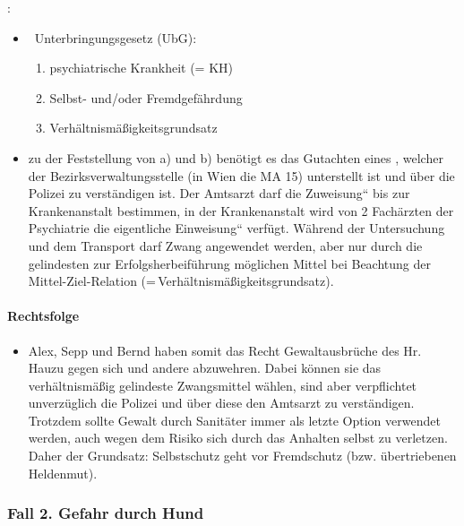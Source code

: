 :

\begin{itemize}
\item {}~Unterbringungsgesetz (UbG):

\begin{enumerate}
\item psychiatrische Krankheit (= KH) 
\item Selbst- und/oder Fremdgefährdung
\item Verhältnismä{\ss}igkeitsgrundsatz

\end{enumerate}
\end{itemize}
\begin{itemize}
\item zu der Feststellung von a) und b) ben\"otigt es das Gutachten eines
, welcher der Bezirksverwaltungsstelle (in Wien die MA 15)
unterstellt ist und \"uber die Polizei zu verständigen ist. Der
Amtsarzt darf die {\quotedblbase}Zuweisung{\textquotedblleft}
bis zur Krankenanstalt bestimmen, in der Krankenanstalt
wird von 2 Fachärzten der Psychiatrie die eigentliche
{\quotedblbase}Einweisung{\textquotedblleft} verf\"ugt. Während
der Untersuchung und dem Transport darf Zwang angewendet werden,
aber nur durch die gelindesten zur Erfolgsherbeif\"uhrung m\"oglichen
Mittel bei Beachtung der Mittel-Ziel-Relation (=\,Verhältnismä{\ss}igkeitsgrundsatz).

\end{itemize}
\paragraph{Rechtsfolge}

\begin{itemize}
\item {\mdseries\color[rgb]{0.0,0.0,0.5019608}
Alex, Sepp und Bernd haben somit das Recht Gewaltausbr\"uche des Hr.
Hauzu gegen sich und andere abzuwehren. Dabei k\"onnen sie das
verhältnismä{\ss}ig gelindeste Zwangsmittel wählen, sind aber
verpflichtet unverz\"uglich die Polizei und \"uber diese den Amtsarzt
zu verständigen. Trotzdem sollte Gewalt durch Sanitäter immer als
letzte Option verwendet werden, auch wegen dem Risiko sich durch das
Anhalten selbst zu verletzen. Daher der Grundsatz: Selbstschutz geht
vor Fremdschutz (bzw. \"ubertriebenen Heldenmut).}

\end{itemize}
\subsubsection{Fall 2. Gefahr durch Hund}
